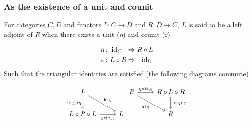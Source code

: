 \subsubsection*{As the existence of a unit and counit}
For categories $C,D$ and functors $L: C\to D$ and $R: D\to C$, $L$ is said to
be a left adjoint of $R$ when there exists a unit ($\eta$) and counit
($\varepsilon$)

\[
  \begin{aligned}
    \eta&:\\
    \varepsilon&:
  \end{aligned}
  \ \begin{aligned}
    \mathrm{id}_C\ \ &\Rightarrow R \circ L\\
    L \circ R &\Rightarrow\ \ \mathrm{id}_D
  \end{aligned}
\]
Such that the triangular identities are satisfied (the following diagrams commute)

\[\begin{tikzcd}
	L \\
	{L\circ R\circ L} & L
	\arrow["{\id_L\circ\eta}"', from=1-1, to=2-1]
	\arrow["{\varepsilon\circ \id_L}"', from=2-1, to=2-2]
	\arrow["{\id_L}", from=1-1, to=2-2]
\end{tikzcd}
\begin{tikzcd}
	R & {R\circ L\circ R} \\
	& R
	\arrow["{\eta\circ\id_R}", from=1-1, to=1-2]
	\arrow["{\id_R \circ \varepsilon}", from=1-2, to=2-2]
	\arrow["{\id_R}"', from=1-1, to=2-2]
\end{tikzcd}\]

